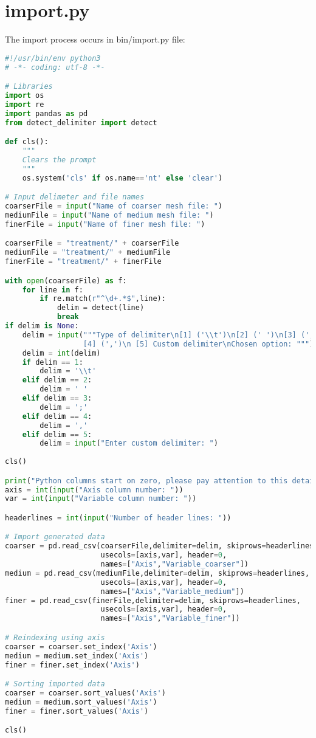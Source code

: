 \section{import.py}
The import process occurs in bin/import.py file:
\begin{lstlisting}[language=python]
#!/usr/bin/env python3
# -*- coding: utf-8 -*-

# Libraries
import os
import re
import pandas as pd
from detect_delimiter import detect

def cls():
    """
    Clears the prompt
    """
    os.system('cls' if os.name=='nt' else 'clear')

# Input delimeter and file names
coarserFile = input("Name of coarser mesh file: ")
mediumFile = input("Name of medium mesh file: ")
finerFile = input("Name of finer mesh file: ")

coarserFile = "treatment/" + coarserFile
mediumFile = "treatment/" + mediumFile
finerFile = "treatment/" + finerFile

with open(coarserFile) as f:
    for line in f:
        if re.match(r"^\d+.*$",line):
            delim = detect(line)
            break
if delim is None:
    delim = input("""Type of delimiter\n[1] ('\\t')\n[2] (' ')\n[3] (';')
                  [4] (',')\n [5] Custom delimiter\nChosen option: """)
    delim = int(delim)
    if delim == 1:
        delim = '\\t'
    elif delim == 2:
        delim = ' '
    elif delim == 3:
        delim = ';'
    elif delim == 4:
        delim = ','
    elif delim == 5:
        delim = input("Enter custom delimiter: ")
        
cls()

print("Python columns start on zero, please pay attention to this detail.\n")
axis = int(input("Axis column number: "))
var = int(input("Variable column number: "))

headerlines = int(input("Number of header lines: "))

# Import generated data
coarser = pd.read_csv(coarserFile,delimiter=delim, skiprows=headerlines,
                      usecols=[axis,var], header=0,
                      names=["Axis","Variable_coarser"])
medium = pd.read_csv(mediumFile,delimiter=delim, skiprows=headerlines,
                      usecols=[axis,var], header=0,
                      names=["Axis","Variable_medium"])
finer = pd.read_csv(finerFile,delimiter=delim, skiprows=headerlines,
                      usecols=[axis,var], header=0,
                      names=["Axis","Variable_finer"])

# Reindexing using axis
coarser = coarser.set_index('Axis')
medium = medium.set_index('Axis')
finer = finer.set_index('Axis')

# Sorting imported data
coarser = coarser.sort_values('Axis')
medium = medium.sort_values('Axis')
finer = finer.sort_values('Axis')

cls()

\end{lstlisting}
